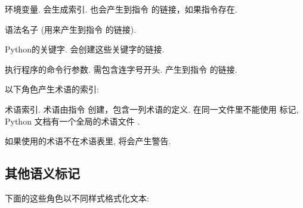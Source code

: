 \documentclass[letterpaper,10pt,english]{sphinxmanual}
\begin{document}
\begin{fulllineitems}
\label{markup/inline:role-envvar}
环境变量.  会生成索引.  也会产生到指令 {\hyperref[domains:directive\string-envvar]{}} 的链接，如果指令存在.

\end{fulllineitems}


\begin{fulllineitems}
\label{markup/inline:role-token}
语法名子 (用来产生到指令 {\hyperref[markup/para:directive\string-productionlist]{}} 的链接).

\end{fulllineitems}


\begin{fulllineitems}
\label{markup/inline:role-keyword}
Python的关键字.  会创建这些关键字的链接.

\end{fulllineitems}


\begin{fulllineitems}
\label{markup/inline:role-option}
执行程序的命令行参数.  需包含连字号开头.  产生到指令 {\hyperref[domains:directive\string-option]{}} 的链接.

\end{fulllineitems}


以下角色产生术语的索引:

\begin{fulllineitems}
\label{markup/inline:role-term}
术语索引.  术语由指令  创建，包含一列术语的定义.
在同一文件里不能使用  标记,
Python 文档有一个全局的术语文件 .

如果使用的术语不在术语表里, 将会产生警告.

\end{fulllineitems}



\subsection{其他语义标记}
\label{markup/inline:id12}
下面的这些角色以不同样式格式化文本:
\end{document}
